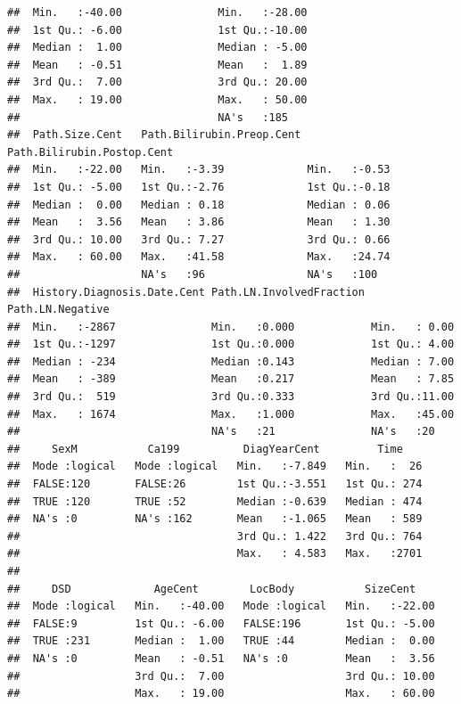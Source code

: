 \documentclass{article}\usepackage[]{graphicx}\usepackage[]{color}
\makeatletter
\newenvironment{kframe}{%
 \def\at@end@of@kframe{}%
 \ifinner\ifhmode%
  \def\at@end@of@kframe{\end{minipage}}%
  \begin{minipage}{\columnwidth}%
 \fi\fi%
 \def\FrameCommand##1{\hskip\@totalleftmargin \hskip-\fboxsep
 \colorbox{shadecolor}{##1}\hskip-\fboxsep
     \hskip-\linewidth \hskip-\@totalleftmargin \hskip\columnwidth}%
 \MakeFramed {\advance\hsize-\width
   \@totalleftmargin\z@ \linewidth\hsize
   \@setminipage}}%
 {\par\unskip\endMakeFramed%
 \at@end@of@kframe}
\newenvironment{knitrout}{}{} %
\makeatother
\begin{document}
\begin{knitrout}
\begin{kframe}
\begin{verbatim}
##  Min.   :-40.00               Min.   :-28.00                
##  1st Qu.: -6.00               1st Qu.:-10.00                
##  Median :  1.00               Median : -5.00                
##  Mean   : -0.51               Mean   :  1.89                
##  3rd Qu.:  7.00               3rd Qu.: 20.00                
##  Max.   : 19.00               Max.   : 50.00                
##                               NA's   :185                   
##  Path.Size.Cent   Path.Bilirubin.Preop.Cent Path.Bilirubin.Postop.Cent
##  Min.   :-22.00   Min.   :-3.39             Min.   :-0.53             
##  1st Qu.: -5.00   1st Qu.:-2.76             1st Qu.:-0.18             
##  Median :  0.00   Median : 0.18             Median : 0.06             
##  Mean   :  3.56   Mean   : 3.86             Mean   : 1.30             
##  3rd Qu.: 10.00   3rd Qu.: 7.27             3rd Qu.: 0.66             
##  Max.   : 60.00   Max.   :41.58             Max.   :24.74             
##                   NA's   :96                NA's   :100               
##  History.Diagnosis.Date.Cent Path.LN.InvolvedFraction Path.LN.Negative
##  Min.   :-2867               Min.   :0.000            Min.   : 0.00   
##  1st Qu.:-1297               1st Qu.:0.000            1st Qu.: 4.00   
##  Median : -234               Median :0.143            Median : 7.00   
##  Mean   : -389               Mean   :0.217            Mean   : 7.85   
##  3rd Qu.:  519               3rd Qu.:0.333            3rd Qu.:11.00   
##  Max.   : 1674               Max.   :1.000            Max.   :45.00   
##                              NA's   :21               NA's   :20      
##     SexM           Ca199          DiagYearCent         Time     
##  Mode :logical   Mode :logical   Min.   :-7.849   Min.   :  26  
##  FALSE:120       FALSE:26        1st Qu.:-3.551   1st Qu.: 274  
##  TRUE :120       TRUE :52        Median :-0.639   Median : 474  
##  NA's :0         NA's :162       Mean   :-1.065   Mean   : 589  
##                                  3rd Qu.: 1.422   3rd Qu.: 764  
##                                  Max.   : 4.583   Max.   :2701  
##                                                                 
##     DSD             AgeCent        LocBody           SizeCent     
##  Mode :logical   Min.   :-40.00   Mode :logical   Min.   :-22.00  
##  FALSE:9         1st Qu.: -6.00   FALSE:196       1st Qu.: -5.00  
##  TRUE :231       Median :  1.00   TRUE :44        Median :  0.00  
##  NA's :0         Mean   : -0.51   NA's :0         Mean   :  3.56  
##                  3rd Qu.:  7.00                   3rd Qu.: 10.00  
##                  Max.   : 19.00                   Max.   : 60.00  

\end{verbatim}
\end{kframe}
\end{knitrout}
\end{document}
